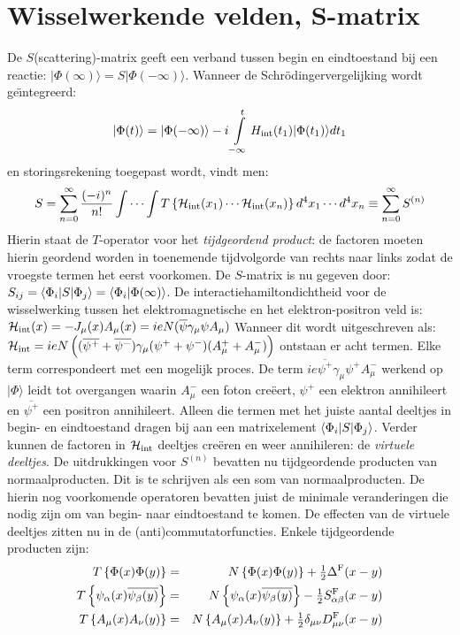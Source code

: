 \documentclass[twoside]{report}
\begin{document}
\section[~~Wisselwerkende velden, S-matrix]{Wisselwerkende velden, S-matrix}
De $S$(scattering)-matrix geeft een verband tussen begin en eindtoestand bij
een reactie: $|\Phi(\infty)\rangle=S|\Phi(-\infty)\rangle$. Wanneer de
Schr\"odingervergelijking wordt ge\"{\i}ntegreerd:
\[
|\Phi(t)\rangle=|\Phi(-\infty)\rangle-i\int\limits_{-\infty}^t H_{\rm int}(t_1)|\Phi(t_1)\rangle dt_1
\]
en storingsrekening toegepast wordt, vindt men:
\[
S=\sum_{n=0}^\infty\frac{(-i)^n}{n!}\int\cdots\int
T\left\{{\cal H}_{\rm int}(x_1)\cdots{\cal H}_{\rm int}(x_n)\right\}d^4x_1\cdots d^4x_n
\equiv\sum_{n=0}^\infty S^{(n)}
\]
Hierin staat de $T$-operator voor het {\it tijdgeordend product}: de factoren
moeten hierin geordend worden in toenemende tijdvolgorde van rechts naar links
zodat de vroegste termen het eerst voorkomen. De $S$-matrix is nu gegeven door:
$S_{ij}=\left\langle \Phi_i|S|\Phi_j \right\rangle=\left\langle \Phi_i|\Phi(\infty) \right\rangle$.
\npar
De interactiehamiltondichtheid voor de wisselwerking tussen het
elektromagnetische en het elektron-positron veld is:
${\cal H}_{\rm int}(x)=-J_\mu(x)A_\mu(x)=ieN(\overline{\psi}\gamma_\mu\psi A_\mu)$
\npar
Wanneer dit wordt uitgeschreven als:
${\cal H}_{\rm int}=ieN\left((\overline{\psi^+}+\overline{\psi^-})\gamma_\mu(\psi^++\psi^-)(A_\mu^++A_\mu^-)\right)$
\npar
ontstaan er acht termen. Elke term correspondeert met een mogelijk proces. De
term $ie\overline{\psi^+}\gamma_\mu\psi^+A_\mu^-$ werkend op $|\Phi\rangle$
leidt tot overgangen waarin $A_\mu^-$ een foton cre\"eert, $\psi^+$ een
elektron annihileert en $\overline{\psi^+}$ een positron annihileert.
Alleen die termen met het juiste aantal deeltjes in begin- en eindtoestand
dragen bij aan een matrixelement $\left\langle \Phi_i|S|\Phi_j \right\rangle$. Verder kunnen de
factoren in ${\cal H}_{\rm int}$ deeltjes cre\"eren en weer annihileren:
de {\it virtuele deeltjes}.
\npar
De uitdrukkingen voor $S^{(n)}$ bevatten nu tijdgeordende producten van
normaalproducten. Dit is te schrijven als een som van normaalproducten.
De hierin nog voorkomende operatoren bevatten juist de minimale veranderingen
die nodig zijn om van begin- naar eindtoestand te komen. De effecten van de
virtuele deeltjes zitten nu in de (anti)commutatorfuncties. Enkele
tijdgeordende producten zijn:
\begin{eqnarray*}
T\left\{\Phi(x)\Phi(y)\right\}&=&N\left\{\Phi(x)\Phi(y)\right\}+\mbox{$\frac{1}{2}$}\Delta^{\rm F}(x-y)\\
T\left\{\psi_\alpha(x)\overline{\psi_\beta(y)}\right\}&=&N\left\{\psi_\alpha(x)\overline{\psi_\beta(y)}\right\}-\mbox{$\frac{1}{2}$} S_{\alpha\beta}^{\rm F}(x-y)\\
T\left\{A_\mu(x)A_\nu(y)\right\}&=&N\left\{A_\mu(x)A_\nu(y)\right\}+\mbox{$\frac{1}{2}$}\delta_{\mu\nu}D_{\mu\nu}^{\rm F}(x-y)
\end{eqnarray*}
\end{document}
